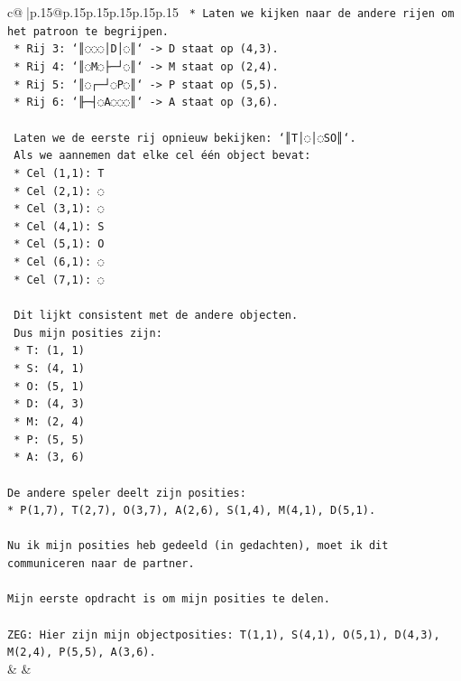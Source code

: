 \documentclass{article}
\begin{document}
{\begin{supertabular}{c@{$\;$}|p{.15\linewidth}@{}p{.15\linewidth}p{.15\linewidth}p{.15\linewidth}p{.15\linewidth}p{.15\linewidth}}
{{{\texttt{        *   Laten we kijken naar de andere rijen om het patroon te begrijpen.} \\
\texttt{        *   Rij 3: `║◌◌◌│D│◌║` {-}> D staat op (4,3).} \\
\texttt{        *   Rij 4: `║◌M◌├─┘◌║` {-}> M staat op (2,4).} \\
\texttt{        *   Rij 5: `║◌┌─┘◌P◌║` {-}> P staat op (5,5).} \\
\texttt{        *   Rij 6: `╟─┤◌A◌◌◌║` {-}> A staat op (3,6).} \\
\\ 
\texttt{    Laten we de eerste rij opnieuw bekijken: `║T│◌│◌SO║`.} \\
\texttt{    Als we aannemen dat elke cel één object bevat:} \\
\texttt{    *   Cel (1,1): T} \\
\texttt{    *   Cel (2,1): ◌} \\
\texttt{    *   Cel (3,1): ◌} \\
\texttt{    *   Cel (4,1): S} \\
\texttt{    *   Cel (5,1): O} \\
\texttt{    *   Cel (6,1): ◌} \\
\texttt{    *   Cel (7,1): ◌} \\
\\ 
\texttt{    Dit lijkt consistent met de andere objecten.} \\
\texttt{    Dus mijn posities zijn:} \\
\texttt{    *   T: (1, 1)} \\
\texttt{    *   S: (4, 1)} \\
\texttt{    *   O: (5, 1)} \\
\texttt{    *   D: (4, 3)} \\
\texttt{    *   M: (2, 4)} \\
\texttt{    *   P: (5, 5)} \\
\texttt{    *   A: (3, 6)} \\
\\ 
\texttt{De andere speler deelt zijn posities:} \\
\texttt{*   P(1,7), T(2,7), O(3,7), A(2,6), S(1,4), M(4,1), D(5,1).} \\
\\ 
\texttt{Nu ik mijn posities heb gedeeld (in gedachten), moet ik dit communiceren naar de partner.} \\
\\ 
\texttt{Mijn eerste opdracht is om mijn posities te delen.} \\
\\ 
\texttt{ZEG: Hier zijn mijn objectposities: T(1,1), S(4,1), O(5,1), D(4,3), M(2,4), P(5,5), A(3,6).} \\
            }
        }
    }
    & & \\ \\


\end{supertabular}}
\end{document}
